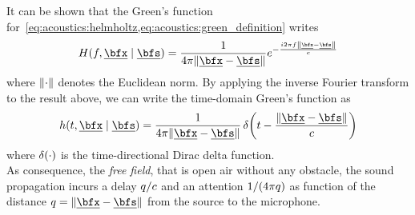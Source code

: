 \mynewline
It can be shown  that the Green's function for~\cref{eq:acoustics:helmholtz,eq:acoustics:green_definition} writes
\begin{equation}
    \label{eq:acoustics:greenFreeFreq}
    H(f, \positionMicrophone \mid \positionSource) = \frac{1}{4 \pi \norm{\positionMicrophone - \positionSource}} \cste^{- \frac{\csti 2 \pi f \norm{\positionMicrophone - \positionSource}}{\speedOfSound}}
\end{equation}
where $\norm{\cdot}$ denotes the Euclidean norm.
By applying the inverse Fourier transform to the result above, we can write the time-domain Green's function as
\begin{equation}
    \label{eq:acoustics:greenFreeTime}
    h(t, \positionMicrophone \mid \positionSource) =
        \frac{1}{4 \pi \norm{\positionMicrophone - \positionSource}}
        \diracOf{t - \frac{\norm{\positionMicrophone - \positionSource}}{\speedOfSound}}
\end{equation}
where $\diracOf{\cdot}$ is the time-directional Dirac delta function.
\\As consequence, the \textit{free field}, that is open air without any obstacle, the  sound propagation incurs a delay $q / c$
and an attention $1 / (4 \pi q)$ as function of the distance
$ \distMicSrc = \norm{\positionMicrophone - \positionSource}$ from the source to the microphone.

